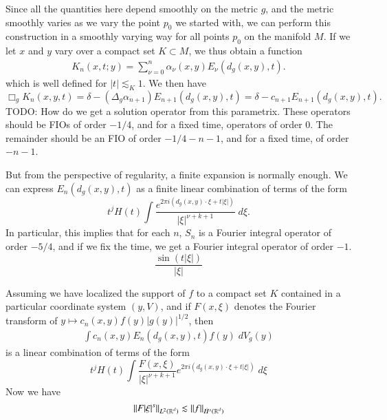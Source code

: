 Since all the quantities here depend smoothly on the metric $g$, and the metric smoothly varies as we vary the point $p_0$ we started with, we can perform this construction in a smoothly varying way for all points $p_0$ on the manifold $M$. If we let $x$ and $y$ vary over a compact set $K \subset M$, we thus obtain a function
%
\begin{align*}
    K_n(x,t;y) = \sum_{\nu = 0}^n \alpha_\nu(x,y) E_\nu( d_g(x,y), t ).
\end{align*}
%
which is well defined for $|t| \lesssim_K 1$. We then have
%
\[ \Box_g K_n(x,y,t) = \delta - (\Delta_g \alpha_{n+1}) E_{n+1}(d_g(x,y), t) = \delta - c_{n+1} E_{n+1}(d_g(x,y), t). \]
%
TODO: How do we get a solution operator from this parametrix. These operators should be FIOs of order $-1/4$, and for a fixed time, operators of order $0$. The remainder should be an FIO of order $-1/4-n-1$, and for a fixed time, of order $-n-1$.
%
%
%
%
%
%


But from the perspective of regularity, a finite expansion is normally enough. We can express $E_n(d_g(x,y),t)$ as a finite linear combination of terms of the form
%
\[ t^j H(t) \int \frac{e^{2 \pi i (d_g(x,y) \cdot \xi + t |\xi|)}}{|\xi|^{\nu + k + 1}}\; d\xi. \]
In particular, this implies that for each $n$, $S_n$ is a Fourier integral operator of order $-5/4$, and if we fix the time, we get a Fourier integral operator of order $-1$.
%
\[ \frac{\sin(t |\xi|)}{|\xi|} \]

Assuming we have localized the support of $f$ to a compact set $K$ contained in a particular coordinate system $(y,V)$, and if $F(x,\xi)$ denotes the Fourier transform of $y \mapsto c_n(x,y) f(y) |g(y)|^{1/2}$, then
%
\begin{align*}
    \int c_n(x,y) E_n(d_g(x,y), t) f(y)\; dV_g(y)
\end{align*}
%
is a linear combination of terms of the form
%
\[ t^j H(t) \int \frac{F(x,\xi)}{|\xi|^{\nu + k + 1}} e^{2 \pi i (d_g(x,y) \cdot \xi + t |\xi|)}\; d\xi \]
%
Now we have
%
\[ \| F |\xi|^s \|_{L^2(\operatorname{\mathbb{R}}^d)} \lesssim \| f \|_{\dot{H}^s(\operatorname{\mathbb{R}}^d)} \]

